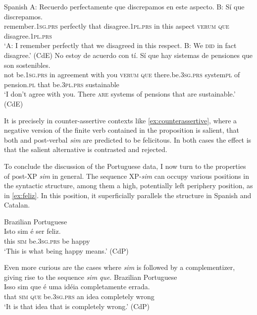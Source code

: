 \ea\label{ex:polarvscontra} Spanish
\ea\label{ex:polarfocus}  \gll A: Recuerdo perfectamente que discrepamos en este aspecto. B: Sí que discrepamos. \\
{} remember.\textsc{1sg.prs} perfectly that disagree.\textsc{1pl.prs} in this aspect {} \textsc{verum} \textsc{que} disagree.\textsc{1pl.prs}\\
\glt `A: I remember perfectly that we disagreed in this respect. B: We \textsc{did} in fact disagree.' (CdE)
\ex\label{ex:counterassertive}
\gll No estoy de acuerdo con tí. Sí que hay sistemas de pensiones que son sostenibles.\\
not be.\textsc{1sg.prs} in agreement with you \textsc{verum} \textsc{que} there.be.\textsc{3sg.prs} system\textsc{pl} of pension.\textsc{pl} that be.\textsc{3pl.prs} sustainable\\
\glt `I don't agree with you. There \textsc{are} systems of pensions that are sustainable.' (CdE)
\z 
\z

It is precisely in   counter-assertive contexts like \eqref{ex:counterassertive}, where a negative version of the finite verb contained in the proposition is salient, that both  and post-verbal \emph{sim} are predicted to be felicitous. In both cases the effect is that the salient alternative is contrasted and rejected. 

To conclude the discussion of the Portuguese data, I now turn to the properties of post-XP \emph{sim} in general. The sequence XP-\emph{sim} can occupy various positions in the syntactic structure, among them  a high,  potentially left periphery position, as in \eqref{ex:feliz}. In this position, it superficially  parallels the  structure in Spanish and Catalan.


\ea\label{ex:feliz}
Brazilian Portuguese\\
\gll Isto sim  é ser feliz. \\
 this  \textsc{sim} be.\textsc{3sg.prs} be happy\\
\glt `This is what being happy means.' (CdP)
\z


Even more curious are the cases where \emph{sim} is followed by a complementizer, giving rise to the sequence \emph{sim que}.
\ea\label{ex:errada} Brazilian Portuguese \\ \gll Isso sim que é uma idéia completamente errada.  \\
 that \textsc{sim} \textsc{que} be.\textsc{3sg.prs} an idea completely wrong\\
\glt `It is that idea that is completely wrong.' (CdP)
\z

